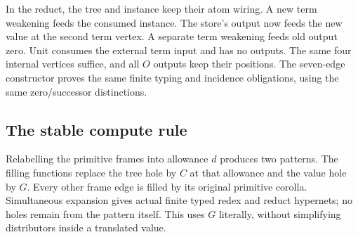 



In the reduct, the tree and instance keep their atom wiring. A new term
weakening feeds the consumed instance. The store's output now feeds the
new value at the second term vertex. A separate term weakening feeds old
output zero. Unit consumes the external term input and has no outputs.
The same four internal vertices suffice, and all $O$ outputs keep their
positions. The seven-edge constructor proves the same finite typing and
incidence obligations, using the same zero/successor distinctions.





\subsection{The stable compute rule}

Relabelling the primitive frames into allowance $d$ produces two patterns.
The filling functions replace the tree hole by $C$ at that allowance and
the value hole by $G$. Every other frame edge is filled by its original
primitive corolla. Simultaneous expansion gives actual finite typed redex
and reduct hypernets; no holes remain from the pattern itself. This uses
$G$ literally, without simplifying distributors inside a translated value.






